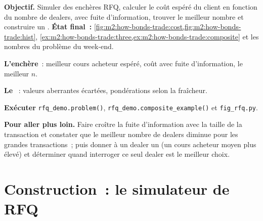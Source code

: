 \begin{tutorial}
\textbf{Objectif.} Simuler des enchères RFQ, calculer le coût espéré du client en fonction du nombre de dealers, avec fuite d'information,
trouver le meilleur nombre et construire un .
\textbf{État final~:} \cref{fig:m2:how-bonds-trade:cost,fig:m2:how-bonds-trade:hist},
\cref{ex:m2:how-bonds-trade:three,ex:m2:how-bonds-trade:composite} et les nombres du
problème du week-end.
\begin{tutsteps}
\item \textbf{L'enchère}~: meilleur cours acheteur espéré, coût avec fuite d'information, le meilleur $n$.
\label{lst:m2:how-bonds-trade:rfq}
\item \textbf{Le }~: valeurs aberrantes écartées, pondérations selon la fraîcheur.
\label{lst:m2:how-bonds-trade:composite}
\item \textbf{Exécuter} \texttt{rfq\_demo.problem()}, \texttt{rfq\_demo.composite\_example()}
et \texttt{fig\_rfq.py}.
\end{tutsteps}
\textbf{Pour aller plus loin.} Faire croître la fuite d'information avec la taille de la transaction et constater
que le meilleur nombre de dealers diminue pour les grandes transactions~; puis donner à un dealer un  (un
cours acheteur moyen plus élevé) et déterminer quand interroger ce seul dealer est le meilleur choix.
\end{tutorial}

\section{Construction~: le simulateur de RFQ}\label{bld:m2:how-bonds-trade:rfq}

